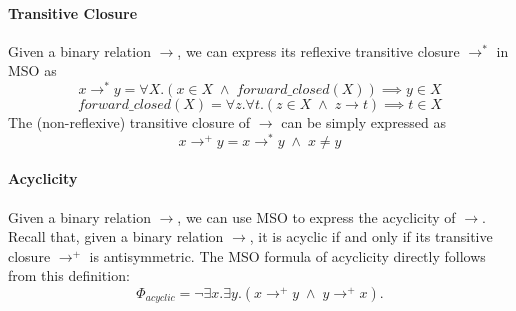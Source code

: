\paragraph*{Transitive Closure}
Given a binary relation $\to$, we can express its reflexive transitive closure $\to^*$ in MSO as
\[
x \to^* y = \forall X.(x \in X \;\wedge\; forward\_closed(X)) \implies y \in X
\]
\[
forward\_closed(X) = \forall z.\forall t.(z \in X \;\wedge\; z \to t) \implies t \in X
\]
The (non-reflexive) transitive closure of $\to$ can be simply expressed as
\[
x \to^+ y = x \to^* y \;\wedge\; x \neq y
\]

\paragraph*{Acyclicity} 

Given a binary relation $\to$, we can use MSO to express the acyclicity of $\to$. Recall that, given a binary relation $\to$, it is acyclic if and only if its transitive closure $\to^+$ is antisymmetric. The MSO formula of acyclicity directly follows from this definition:
\[
\Phi_{acyclic} =  \neg \exists x.\exists y.(x \to^+ y \;\wedge\; y \to^+ x).   
\]